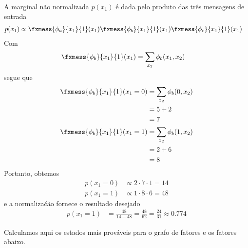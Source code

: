 \begin{exenumerate}
    \begin{solution}
        A marginal n\~ao normalizada $p(x_1)$ \'e dada pelo produto das tr\^es mensagens de entrada
        \begin{align}
            p(x_1) & \propto \fxmess{\phi_a}{x_1}{1}(x_1)\fxmess{\phi_b}{x_1}{1}(x_1) \fxmess{\phi_c}{x_1}{1}(x_1)
        \end{align}
        Com
        \begin{align}
            \fxmess{\phi_b}{x_1}{1}(x_1) & = \sum_{x_2} \phi_b(x_1,x_2)
        \end{align}
        segue que
        \begin{align}
            \fxmess{\phi_b}{x_1}{1}(x_1=0) & = \sum_{x_2} \phi_b(0,x_2)\\
            & = 5+2 \\
            & = 7\\
            \fxmess{\phi_b}{x_1}{1}(x_1=1) & = \sum_{x_2} \phi_b(1,x_2)\\
            & = 2+6\\
            & = 8
        \end{align}
        Portanto, obtemos
        \begin{align}
            p(x_1=0) &\propto 2 \cdot 7 \cdot 1 = 14\\
            p(x_1=1) &\propto 1 \cdot 8 \cdot 6 = 48
        \end{align}
        e a normaliza\'c\~ao fornece o resultado desejado
        \begin{align}
            p(x_1=1) & = \frac{48}{14+48} = \frac{48}{62} = \frac{24}{31} \approx 0.774
        \end{align}
        
    \end{solution}
    
    
    
\end{exenumerate}




\label{ex:max-sum-message-passing-alt}
Calculamos aqui os estados mais prov\'aveis para o grafo de fatores e os fatores abaixo.

